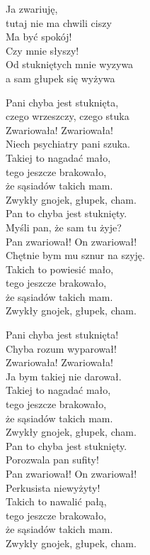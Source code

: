 \begin{text}
    \vin Ja zwariuję,\\
    \vin tutaj nie ma chwili ciszy\\
    \vin Ma być spokój!\\
    \vin Czy mnie słyszy!\\
    \vin Od stukniętych mnie wyzywa\\
    \vin a sam głupek się wyżywa

    Pani chyba jest stuknięta,\\
    czego wrzeszczy, czego stuka\\
    Zwariowała! Zwariowała!\\
    Niech psychiatry pani szuka.\\
    Takiej to nagadać mało,\\
    tego jeszcze brakowało,\\
    że sąsiadów takich mam.\\
    Zwykły gnojek, głupek, cham.\\
    \vin Pan to chyba jest stuknięty.\\
    \vin Myśli pan, że sam tu żyje?\\
    \vin Pan zwariował! On zwariował!\\
    \vin Chętnie bym mu sznur na szyję.\\
    \vin Takich to powiesić mało,\\
    \vin tego jeszcze brakowało,\\
    \vin że sąsiadów takich mam.\\
    \vin Zwykły gnojek, głupek, cham.

    Pani chyba jest stuknięta!\\
    Chyba rozum wyparował!\\
    Zwariowała! Zwariowała!\\
    Ja bym takiej nie darował.\\
    Takiej to nagadać mało,\\
    tego jeszcze brakowało,\\
    że sąsiadów takich mam.\\
    Zwykły gnojek, głupek, cham.\\
    \vin Pan to chyba jest stuknięty.\\
    \vin Porozwala pan sufity!\\
    \vin Pan zwariował! On zwariował!\\
    \vin Perkusista niewyżyty!\\
    \vin Takich to nawalić pałą,\\
    \vin tego jeszcze brakowało,\\
    \vin że sąsiadów takich mam.\\
    \vin Zwykły gnojek, głupek, cham.
\end{text}

